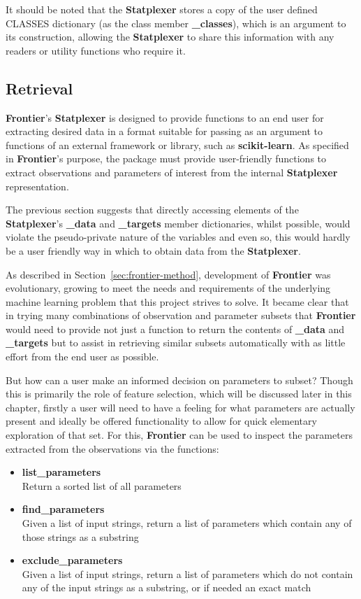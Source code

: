 It should be noted that the \textbf{Statplexer} stores a copy of the user
defined CLASSES dictionary (as the class member \textbf{\_classes}), which is an
argument to its construction, allowing the \textbf{Statplexer} to share this
information with any readers or utility functions who require it.


\subsection{Retrieval}

\textbf{Frontier}'s \textbf{Statplexer} is designed to provide functions to an
end user for extracting desired data in a format suitable for passing as an
argument to functions of an external framework or library, such as
\textbf{scikit-learn}. As specified in \textbf{Frontier}'s purpose, the package
must provide user-friendly functions to extract observations and parameters of
interest from the internal \textbf{Statplexer} representation.

The previous section suggests that directly accessing elements of the
\textbf{Statplexer}'s \textbf{\_data} and \textbf{\_targets} member dictionaries,
whilst possible, would violate the pseudo-private nature of the variables and even
so, this would hardly be a user friendly way in which to obtain data from the
\textbf{Statplexer}.

As described in Section~\ref{sec:frontier-method}, development of
\textbf{Frontier} was evolutionary, growing to meet the needs and requirements
of the underlying machine learning problem that this project strives to solve.
It became clear that in trying many combinations of observation and parameter
subsets that \textbf{Frontier} would need to provide not just a function to
return the contents of \textbf{\_data} and \textbf{\_targets} but to assist in
retrieving similar subsets automatically with as little effort from the end user
as possible.

But how can a user make an informed decision on parameters to subset?
Though this is primarily the role of feature selection, which will be discussed
later in this chapter, firstly a user will need to have a feeling for what
parameters are actually present and ideally be offered functionality to
allow for quick elementary exploration of that set. For this, \textbf{Frontier}
can be used to inspect the parameters extracted from the observations via the
functions:

\begin{itemize}
    \item \textbf{list\_parameters} \hfill\\
        Return a sorted list of all parameters
    \item \textbf{find\_parameters} \hfill\\
        Given a list of input strings, return a list of parameters which contain
        any of those strings as a substring
    \item \textbf{exclude\_parameters} \hfill\\
        Given a list of input strings, return a list of parameters which do not
        contain any of the input strings as a substring, or if needed an exact
        match
\end{itemize}

